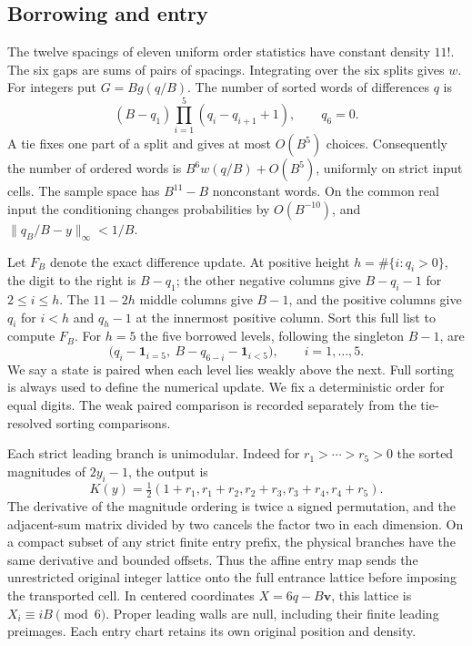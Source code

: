 \documentclass[11pt,reqno]{amsart}
\theoremstyle{definition}
\newcommand{\vct}{\mathbf v}
\newcommand{\one}{\mathbf 1}
\begin{document}
\subsection{Borrowing and entry}\label{sec:entry}
The twelve spacings of eleven uniform order statistics have constant
density \(11!\). The six gaps are sums of pairs of spacings. Integrating
over the six splits gives \(w\). For integers put \(G=B g(q/B)\).
The number of sorted words of differences \(q\) is
\[
 (B-q_1)\prod_{i=1}^5(q_i-q_{i+1}+1),\qquad q_6=0.
\]
A tie fixes one part of a split and gives at most \(O(B^5)\) choices.
Consequently the number of ordered words is \(B^6w(q/B)+O(B^5)\),
uniformly on strict input cells. The sample space has \(B^{11}-B\)
nonconstant words. On the common real input the conditioning changes
probabilities by \(O(B^{-10})\), and \(\|q_B/B-y\|_\infty<1/B\).

Let \(F_B\) denote the exact difference update. At positive height
\(h=\#\{i:q_i>0\}\), the digit to the right is \(B-q_1\); the other
negative columns give \(B-q_i-1\) for \(2\le i\le h\). The \(11-2h\)
middle columns give \(B-1\), and the positive columns give \(q_i\) for
\(i<h\) and \(q_h-1\) at the innermost positive column. Sort this full
list to compute \(F_B\). For \(h=5\) the five borrowed levels, following
the singleton \(B-1\), are
\[
 \bigl(q_i-\one_{i=5},\ B-q_{6-i}-\one_{i<5}\bigr),
       \qquad i=1,\ldots,5.
\]
We say a state is paired when each level lies weakly above the next.
Full sorting is always used to define the numerical update. We fix a
deterministic order for equal digits. The weak paired comparison is
recorded separately from the tie-resolved sorting comparisons.

Each strict leading branch is unimodular. Indeed for
\(r_1>\cdots>r_5>0\) the sorted magnitudes of \(2y_i-1\), the output is
\[
 K(y)=\tfrac12(1+r_1,r_1+r_2,r_2+r_3,r_3+r_4,r_4+r_5).
\]
The derivative of the magnitude ordering is twice a signed permutation,
and the adjacent-sum matrix divided by two cancels the factor two in
each dimension. On a compact subset of any strict finite entry prefix,
the physical branches have the same derivative and bounded offsets.
Thus the affine entry map sends the unrestricted original integer
lattice onto the full entrance lattice before imposing the transported
cell. In centered coordinates \(X=6q-B\vct\), this lattice is
\(X_i\equiv iB\pmod6\). Proper leading walls are null, including their
finite leading preimages. Each entry chart retains its own original
position and density.
\end{document}
